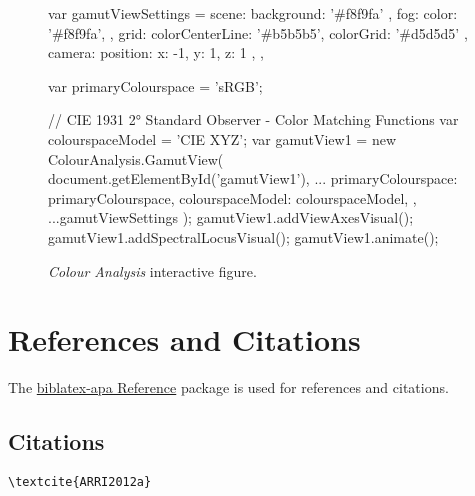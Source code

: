 \begin{figure}[H]
    \ifdefined\HCode
        \JavaScript
            var gamutViewSettings = {
                    scene: {
                        background: '#f8f9fa'
                    },
                    fog: {
                        color: '#f8f9fa',
                    },
                    grid: {
                        colorCenterLine: '#b5b5b5',
                        colorGrid: '#d5d5d5'
                    },
                    camera: {
                        position: { x: -1, y: 1, z: 1 },
                    },
            }

            var primaryColourspace = 'sRGB';

            // CIE 1931 2° Standard Observer - Color Matching Functions
            var colourspaceModel = 'CIE XYZ';
            var gamutView1 = new ColourAnalysis.GamutView(
                document.getElementById('gamutView1'),
                {
                    ...{
                        primaryColourspace: primaryColourspace,
                        colourspaceModel: colourspaceModel,
                    },
                    ...gamutViewSettings
                }
            );
            gamutView1.addViewAxesVisual();
            gamutView1.addSpectralLocusVisual();
            gamutView1.animate();
        \EndJavaScript
    \fi
    \caption{
        \textit{Colour Analysis} interactive figure.
    }
    \label{fig:colour-analysis-interactive-figure}
\end{figure}

\section*{References and Citations}
\label{sec:references-and-citations}

The \href{https://ctan.org/pkg/biblatex-apa}{biblatex-apa Reference}
package is used for references and citations.

\subsection*{Citations}
\label{subsec:citations}

\begin{lstlisting}[caption={Citation for Single Author.}]
\textcite{ARRI2012a}
\end{lstlisting}

\textcite{ARRI2012a}

